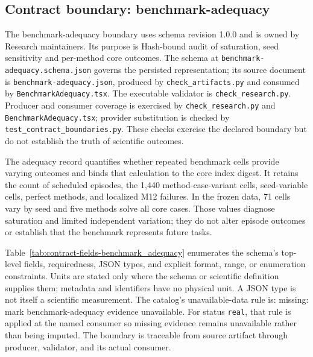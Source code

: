 \subsection{Contract boundary: benchmark-adequacy}\label{sec:contract-benchmark_adequacy}
The benchmark-adequacy boundary uses schema revision 1.0.0 and is owned by Research maintainers. Its purpose is Hash-bound audit of saturation, seed sensitivity and per-method core outcomes. The schema at \texttt{benchmark-adequacy.schema.json} governs the persisted representation; its source document is \texttt{benchmark-adequacy.json}, produced by \texttt{check\_\allowbreak{}artifacts.py} and consumed by \texttt{Benchmark\allowbreak{}Adequacy.tsx}. The executable validator is \texttt{check\_\allowbreak{}research.py}. Producer and consumer coverage is exercised by \texttt{check\_\allowbreak{}research.py} and \texttt{Benchmark\allowbreak{}Adequacy.tsx}; provider substitution is checked by \texttt{test\_\allowbreak{}contract\_\allowbreak{}boundaries.py}. These checks exercise the declared boundary but do not establish the truth of scientific outcomes.

The adequacy record quantifies whether repeated benchmark cells provide varying outcomes and binds that calculation to the core index digest. It retains the count of scheduled episodes, the 1,440 method-case-variant cells, seed-variable cells, perfect methods, and localized M12 failures. In the frozen data, 71 cells vary by seed and five methods solve all core cases. Those values diagnose saturation and limited independent variation; they do not alter episode outcomes or establish that the benchmark represents future tasks.

Table~\ref{tab:contract-fields-benchmark_adequacy} enumerates the schema's top-level fields, requiredness, JSON types, and explicit format, range, or enumeration constraints. Units are stated only where the schema or scientific definition supplies them; metadata and identifiers have no physical unit. A JSON type is not itself a scientific measurement. The catalog's unavailable-data rule is: missing: mark benchmark-adequacy evidence unavailable. For status \texttt{real}, that rule is applied at the named consumer so missing evidence remains unavailable rather than being imputed. The boundary is traceable from source artifact through producer, validator, and its actual consumer.

